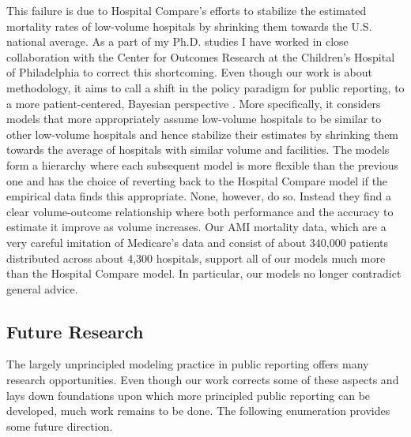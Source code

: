 \documentclass[10pt,twoside]{article}
\theoremstyle{definition}
\theoremstyle{definition}
\begin{document}
This failure is due to Hospital Compare's efforts to stabilize the estimated mortality rates of low-volume hospitals by shrinking them towards the U.S. national average. As a part of my Ph.D. studies I have worked in close collaboration with the Center for Outcomes Research at the Children's Hospital of Philadelphia to correct this shortcoming. 
Even though our work is about methodology, it aims to call a shift in the policy paradigm for public reporting, to a more patient-centered, Bayesian perspective \citep{publicReporting, publicReporting2}.  More specifically, it considers models that more appropriately assume low-volume hospitals to be similar to other low-volume hospitals and hence stabilize their estimates by shrinking them towards the average of hospitals with similar volume and facilities. The models form a hierarchy where each subsequent model is more flexible than the previous one and has the choice of reverting back to the Hospital Compare model if the empirical data finds this appropriate. 
 None, however, do so. Instead they find a clear volume-outcome relationship where both performance and the accuracy to estimate it improve as volume increases. 
Our AMI mortality data, which are a very careful imitation of Medicare's data and consist of about 340,000 patients distributed across about 4,300 hospitals, support all of our models much more than the Hospital Compare model. In particular, our models no longer contradict general advice. 


 \vspace{-1em} \subsection{Future Research} \vspace{-0.5em}
The largely unprincipled modeling practice in public reporting offers many research opportunities. Even though our work corrects some of these aspects and lays down foundations upon which more principled public reporting can be developed, much work remains to be done. The following enumeration provides some future direction. 
\end{document}
